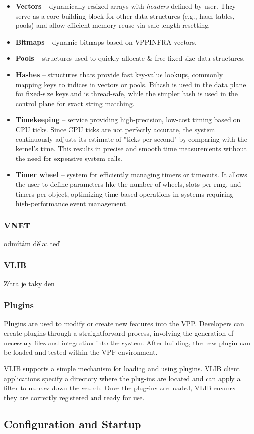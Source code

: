 \begin{itemize}
  \item \textbf{Vectors} -- dynamically resized arrays with \textit{headers} defined by user. They serve as a core building block for other data structures (e.g., hash tables, pools) and allow efficient memory reuse via safe length resetting.
  \item \textbf{Bitmaps} -- dynamic bitmaps based on VPPINFRA vectors.
  \item \textbf{Pools} -- structures used to quickly allocate \& free fixed-size data structures. 
  \item \textbf{Hashes} -- structures thats provide fast key-value lookups, commonly mapping keys to indices in vectors or pools. Bihash is used in the data plane for fixed-size keys and is thread-safe, while the simpler hash is used in the control plane for exact string matching.
  \item \textbf{Timekeeping} -- service providing high-precision, low-cost timing based on CPU ticks. Since CPU ticks are not perfectly accurate, the system continuously adjusts its estimate of "ticks per second" by comparing with the kernel’s time. This results in precise and smooth time measurements without the need for expensive system calls. 
  \item \textbf{Timer wheel} -- system for efficiently managing timers or timeouts. It allows the user to define parameters like the number of wheels, slots per ring, and timers per object, optimizing time-based operations in systems requiring high-performance event management.
\end{itemize}

\subsubsection{VNET}
odmítám dělat teď

\subsubsection{VLIB}
Zítra je taky den

\subsubsection{Plugins}
Plugins are used to modify or create new features into the VPP. 
Developers can create plugins through a straightforward process, involving the generation of necessary files and integration into the system. 
After building, the new plugin can be loaded and tested within the VPP environment. 

VLIB supports a simple mechanism for loading and using plugins. 
VLIB client applications specify a directory where the plug-ins are located and can apply a filter to narrow down the search. 
Once the plug-ins are loaded, VLIB ensures they are correctly registered and ready for use.


\subsection{Configuration and Startup}
